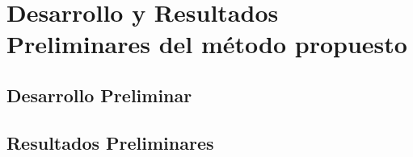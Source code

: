 \chapter{Desarrollo y Resultados Preliminares del método propuesto}


\section{Desarrollo Preliminar}

\section{Resultados Preliminares}
